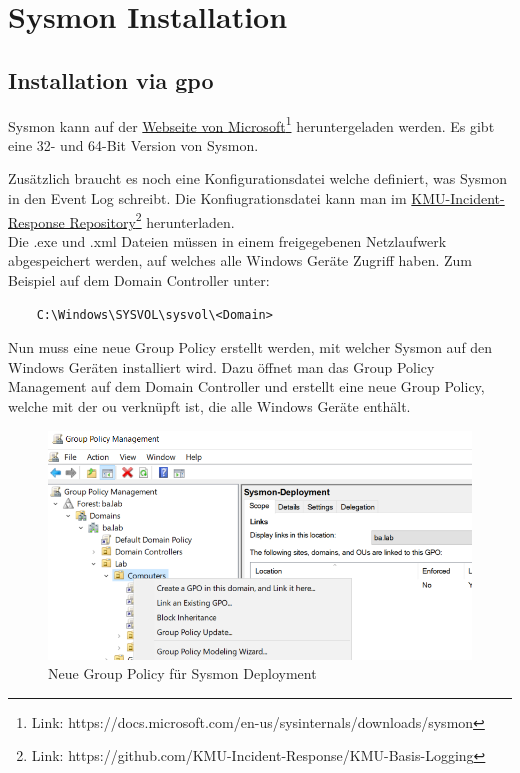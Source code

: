 \chapter{Sysmon Installation}

\section{Installation via \acrshort{gpo}}

Sysmon kann auf der \href{https://docs.microsoft.com/en-us/sysinternals/downloads/sysmon}{Webseite von Microsoft}\footnote{Link: https://docs.microsoft.com/en-us/sysinternals/downloads/sysmon} heruntergeladen werden.
Es gibt eine 32- und 64-Bit Version von Sysmon.

Zusätzlich braucht es noch eine Konfigurationsdatei welche definiert, was Sysmon in den Event Log schreibt.
Die Konfiugrationsdatei kann man im \href{https://github.com/KMU-Incident-Response/KMU-Basis-Logging}{KMU-Incident-Response Repository}\footnote{Link: https://github.com/KMU-Incident-Response/KMU-Basis-Logging} herunterladen.\\

Die .exe und .xml Dateien müssen in einem freigegebenen Netzlaufwerk abgespeichert werden, auf welches alle Windows Geräte Zugriff haben. Zum Beispiel auf dem Domain Controller unter:
\begin{lstlisting}
    C:\Windows\SYSVOL\sysvol\<Domain>
\end{lstlisting}

Nun muss eine neue Group Policy erstellt werden, mit welcher Sysmon auf den Windows Geräten installiert wird.
Dazu öffnet man das Group Policy Management auf dem Domain Controller und erstellt eine neue Group Policy, welche mit der \acrshort{ou} verknüpft ist, die alle Windows Geräte enthält.
\begin{figure}[H]
    \centering
    \includegraphics[width=0.7\linewidth]{../img/agent/create-new-group-policy.png}
    \caption{Neue Group Policy für Sysmon Deployment}
\end{figure}

